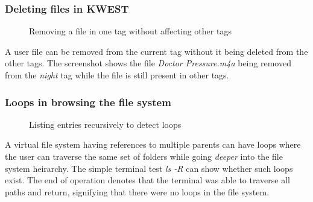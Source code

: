 \subsubsection{Deleting files in KWEST}
\begin{figure}[htb]
\centering
\setlength\fboxsep{0pt}
\setlength\fboxrule{0.5pt}
\caption{Removing a file in one tag without affecting other tags}
\label{fig:dfd0}
\end{figure}
A user file can be removed from the current tag without it being deleted from the other tags. The screenshot shows the file \emph{Doctor Pressure.m4a} being removed from the \emph{night} tag while the file is still present in other tags.

\subsubsection{Loops in browsing the file system}
\begin{figure}[htb]
\centering
\setlength\fboxsep{0pt}
\setlength\fboxrule{0.5pt}
\caption{Listing entries recursively to detect loops}
\label{fig:dfd0}
\end{figure}
A virtual file system having references to multiple parents can have loops where the user can traverse the same set of folders while going \emph{deeper} into the file system heirarchy. The simple terminal test \emph{ls -R} can show whether such loops exist. The end of operation denotes that the terminal was able to traverse all paths and return, signifying that there were no loops in the file system.

